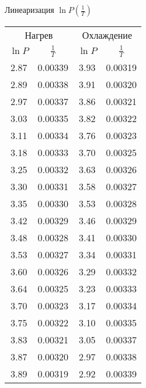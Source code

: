\begin{subtable}{0.48\textwidth}\centering
\caption{Линеаризация  $\ln{P}(\frac{1}{T})$}
\label{tab:linear}
\begin{tabular}{cccc}
\toprule
\multicolumn{2}{c}{Нагрев} & \multicolumn{2}{c}{Охлаждение} \\
$\ln{P}$ & $\frac{1}{T}$ & $\ln{P}$ & $\frac{1}{T}$ \\
\midrule
2.87 & 0.00339 & 3.93 & 0.00319 \\
2.89 & 0.00338 & 3.91 & 0.00320 \\
2.97 & 0.00337 & 3.86 & 0.00321 \\
3.03 & 0.00335 & 3.82 & 0.00322 \\
3.11 & 0.00334 & 3.76 & 0.00323 \\
3.18 & 0.00333 & 3.70 & 0.00325 \\
3.25 & 0.00332 & 3.63 & 0.00326 \\
3.30 & 0.00331 & 3.58 & 0.00327 \\
3.35 & 0.00330 & 3.53 & 0.00328 \\
3.42 & 0.00329 & 3.46 & 0.00329 \\
3.48 & 0.00328 & 3.41 & 0.00330 \\
3.53 & 0.00327 & 3.34 & 0.00331 \\
3.60 & 0.00326 & 3.29 & 0.00332 \\
3.64 & 0.00325 & 3.23 & 0.00333 \\
3.70 & 0.00323 & 3.17 & 0.00334 \\
3.75 & 0.00322 & 3.10 & 0.00335 \\
3.83 & 0.00321 & 3.05 & 0.00337 \\
3.87 & 0.00320 & 2.97 & 0.00338 \\
3.89 & 0.00319 & 2.92 & 0.00339 \\
\bottomrule
\end{tabular}
\end{subtable}
    